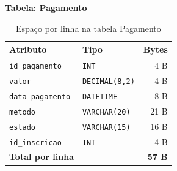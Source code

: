 \documentclass[runningheads]{llncs}
\begin{document}
                \vspace{0.4cm}
                \noindent\begin{minipage}{\textwidth}
                \noindent\textbf{Tabela: Pagamento}\\[0.2cm]

                \begin{table}[H]
                \centering
                \renewcommand{\arraystretch}{1.3}
                \begin{tabular}{|l|l|r|}
                \hline
                \textbf{Atributo} & \textbf{Tipo} & \textbf{Bytes} \\ \hline
                \texttt{id\_pagamento}   & \texttt{INT}          & 4 B \\ \hline
                \texttt{valor}           & \texttt{DECIMAL(8,2)} & 4 B \\ \hline
                \texttt{data\_pagamento} & \texttt{DATETIME}     & 8 B \\ \hline
                \texttt{metodo}          & \texttt{VARCHAR(20)}  & 21 B \\ \hline
                \texttt{estado}          & \texttt{VARCHAR(15)}  & 16 B \\ \hline
                \texttt{id\_inscricao}   & \texttt{INT}          & 4 B \\ \hline
                \textbf{Total por linha} & & \textbf{57 B} \\ \hline
                \end{tabular}
                \vspace{0.2cm}
                \caption{Espaço por linha na tabela Pagamento} \label{tab:bytes_pagamento}
                \end{table}
                \end{minipage}
\end{document}
